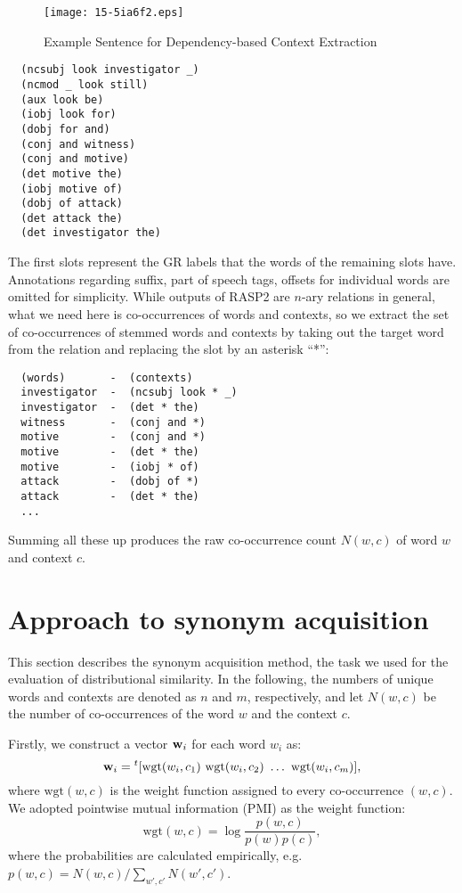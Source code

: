 \documentclass[english]{jnlp_1.4}
\begin{document}
\begin{figure}[t]
\begin{center}
\texttt{[image: 15-5ia6f2.eps]}
\end{center}
\caption{Example Sentence for Dependency-based Context Extraction}
\label{fig_dbc_example}
\end{figure}

\begin{verbatim}
  (ncsubj look investigator _)
  (ncmod _ look still)
  (aux look be)
  (iobj look for)
  (dobj for and)
  (conj and witness)
  (conj and motive)
  (det motive the)
  (iobj motive of)
  (dobj of attack)
  (det attack the)
  (det investigator the)
\end{verbatim}

The first slots represent the GR labels that the words of the
remaining slots have. Annotations regarding suffix, part of speech
tags, offsets for individual words are omitted for simplicity. While
outputs of RASP2 are $n$-ary relations in general, what we need here
is co-occurrences of words and contexts, so we extract the set of
co-occurrences of stemmed words and contexts by taking out the target
word from the relation and replacing the slot by an asterisk ``*'':

\begin{verbatim}
  (words)       -  (contexts)
  investigator  -  (ncsubj look * _)
  investigator  -  (det * the)
  witness       -  (conj and *)
  motive        -  (conj and *)
  motive        -  (det * the)
  motive        -  (iobj * of)
  attack        -  (dobj of *)
  attack        -  (det * the)
  ...
\end{verbatim}

Summing all these up produces the raw co-occurrence count $N(w, c)$ of
word $w$ and context $c$.

\section{Approach to synonym acquisition}

This section describes the synonym acquisition method, the task we
used for the evaluation of distributional similarity.  In the
following, the numbers of unique words and contexts are denoted as $n$
and $m$, respectively, and let $N(w, c)$ be the number of
co-occurrences of the word $w$ and the context $c$.

Firstly, we construct a vector ${\bf w}_i$ for each word $w_i$ as:
\[
{\bf w}_i = {}^t[\mbox{wgt}(w_i, c_1)\ \mbox{wgt}(w_i, c_2)\  \ldots\ \mbox{wgt}(w_i, c_m)],
\]
where $\mbox{wgt}(w, c)$ is the weight function assigned to every
co-occurrence $(w, c)$. We adopted pointwise mutual information
(PMI) as the weight function:
\[
  \mbox{wgt}(w, c) = \log \frac{p(w,c)}{p(w)p(c)},
\]
where the probabilities are calculated empirically, e.g. $p(w, c) =
N(w, c) / \sum_{w', c'} N(w', c')$. 
\end{document}
